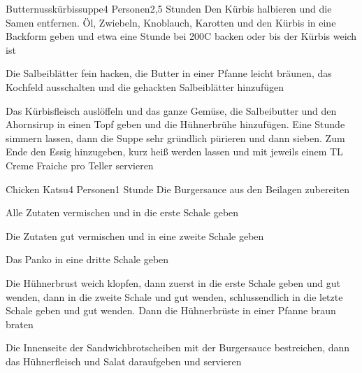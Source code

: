 
\begin{recipe}{Butternusskürbissuppe}{4 Personen}{2,5 Stunden}
Den Kürbis halbieren und die Samen entfernen.
Öl, Zwiebeln, Knoblauch, Karotten und den Kürbis in eine Backform geben und etwa eine Stunde bei 200\0C backen oder bis der Kürbis weich ist

Die Salbeiblätter fein hacken, die Butter in einer Pfanne leicht bräunen, das Kochfeld ausschalten und die gehackten Salbeiblätter hinzufügen


Das Kürbisfleisch auslöffeln und das ganze Gemüse, die Salbeibutter und den Ahornsirup in einen Topf geben und die Hühnerbrühe hinzufügen. Eine Stunde simmern lassen, dann die Suppe sehr gründlich pürieren und dann sieben. Zum Ende den Essig hinzugeben, kurz heiß werden lassen und mit jeweils einem TL Creme Fraiche pro Teller servieren
\end{recipe}


\begin{recipe}{Chicken Katsu}{4 Personen}{1 Stunde}
Die Burgersauce aus den Beilagen zubereiten

Alle Zutaten vermischen und in die erste Schale geben

Die Zutaten gut vermischen und in eine zweite Schale geben

Das Panko in eine dritte Schale geben

Die Hühnerbrust weich klopfen, dann zuerst in die erste Schale geben und gut wenden, dann in die zweite Schale und gut wenden, schlussendlich in die letzte Schale geben und gut wenden. Dann die Hühnerbrüste in einer Pfanne braun braten

Die Innenseite der Sandwichbrotscheiben mit der Burgersauce bestreichen, dann das Hühnerfleisch und Salat daraufgeben und servieren
\end{recipe}

